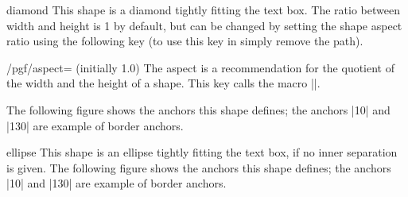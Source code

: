 \begin{shape}{diamond}
  This shape is a diamond tightly fitting the text box. The ratio
  between width and height is 1 by default, but can be changed by
  setting the shape aspect ratio using the following \pgfname{}
  key (to use this key in \tikzname{} simply remove the
   path).

  \begin{key}{/pgf/aspect= (initially 1.0)}
    The aspect is a recommendation for the quotient of the width and
    the height of a shape. This key calls the macro
    |\pgfsetshapeaspect|.
  \end{key}

  The following figure shows the anchors this
  shape defines; the anchors |10| and |130| are example of border
  anchors.

\begin{codeexample}[]
\Huge
{}
\end{codeexample}
\end{shape}

\begin{shape}{ellipse}
  This shape is an ellipse tightly fitting the text box, if no inner
  separation is given. The following figure shows the anchors this
  shape defines; the anchors |10| and |130| are example of border anchors.
\begin{codeexample}[]
\Huge
{}
\end{codeexample}
\end{shape}





